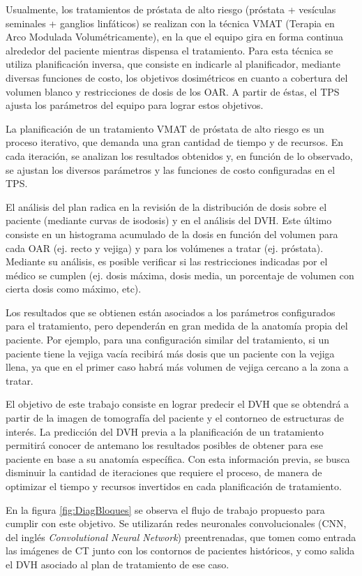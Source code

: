 \documentclass[
11pt, %
codirector, %
]{charter}
\begin{document}
Usualmente, los tratamientos de próstata de alto riesgo (próstata + vesículas seminales + ganglios linfáticos) se realizan con la técnica VMAT (Terapia en Arco Modulada Volumétricamente), en la que el equipo gira en forma continua alrededor del paciente mientras dispensa el tratamiento. Para esta técnica se utiliza planificación inversa, que consiste en indicarle al planificador, mediante diversas funciones de costo, los objetivos dosimétricos en cuanto a cobertura del volumen blanco y restricciones de dosis de los OAR. A partir de éstas, el TPS ajusta los parámetros del equipo para lograr estos objetivos.

La planificación de un tratamiento VMAT de próstata de alto riesgo es un proceso iterativo, que demanda una gran cantidad de tiempo y de recursos. En cada iteración, se analizan los resultados obtenidos y, en función de lo observado, se ajustan los diversos parámetros y las funciones de costo configuradas en el TPS. 

El análisis del plan radica en la revisión de la distribución de dosis sobre el paciente (mediante curvas de isodosis) y en el análisis del DVH. Este último consiste en un histograma acumulado de la dosis en función del volumen para cada OAR (ej. recto y vejiga) y para los volúmenes a tratar (ej. próstata). Mediante su análisis, es posible verificar si las restricciones indicadas por el médico se cumplen (ej. dosis máxima, dosis media, un porcentaje de volumen con cierta dosis como máximo, etc). 

Los resultados que se obtienen están asociados a los parámetros configurados para el tratamiento, pero dependerán en gran medida de la anatomía propia del paciente. Por ejemplo, para una configuración similar del tratamiento, si un paciente tiene la vejiga vacía recibirá más dosis que un paciente con la vejiga llena, ya que en el primer caso habrá más volumen de vejiga cercano a la zona a tratar.

El objetivo de este trabajo consiste en lograr predecir el DVH que se obtendrá a partir de la imagen de tomografía del paciente y el contorneo de estructuras de interés. La predicción del DVH previa a la planificación de un tratamiento permitirá conocer de antemano los resultados posibles de obtener para ese paciente en base a su anatomía específica. Con esta información previa, se busca disminuir la cantidad de iteraciones que requiere el proceso, de manera de optimizar el tiempo y recursos invertidos en cada planificación de tratamiento. 

En la figura \ref{fig:DiagBloques} se observa el flujo de trabajo propuesto para cumplir con este objetivo. Se utilizarán redes neuronales convolucionales (CNN, del inglés \textit{Convolutional Neural Network}) preentrenadas, que tomen como entrada las imágenes de CT junto con los contornos de pacientes históricos, y como salida el DVH asociado al plan de tratamiento de ese caso. 
\end{document}
